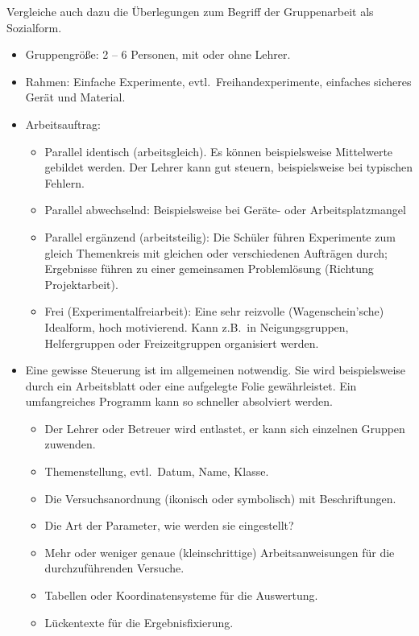 Vergleiche auch dazu die \"{U}berlegungen zum Begriff der
Gruppenarbeit als Sozialform.

\begin{itemize}
	\item
	Gruppengr\"{o}{\ss}e: 2 -- 6 Personen, mit oder ohne Lehrer.
	
	\item
	Rahmen: Einfache Experimente, evtl.\ Freihandexperimente,
	einfaches sicheres Ger\"{a}t und Material.
	\item
	Arbeitsauftrag:
	\begin{itemize}
		\item
		Parallel identisch (arbeitsgleich).
		Es k\"{o}nnen beispielsweise Mittelwerte gebildet werden.
		Der Lehrer kann gut steuern, beispielsweise bei typischen Fehlern.
		\item
		Parallel abwechselnd:
		Beispielsweise bei Ger\"{a}te- oder Arbeitsplatzmangel
		\item
		Parallel erg\"{a}nzend (arbeitsteilig):
		Die Sch\"{u}ler f\"{u}hren Experimente zum gleich Themenkreis mit
		gleichen oder verschiedenen Auftr\"{a}gen durch;
		Ergebnisse f\"{u}hren zu einer gemeinsamen Probleml\"{o}sung
		(Richtung Projektarbeit).
		\item
		Frei (Experimentalfreiarbeit):
		Eine sehr reizvolle (Wagenschein'sche) Idealform, hoch motivierend.
		Kann z.B.\ in Neigungsgruppen, Helfergruppen oder
		Freizeitgruppen organisiert werden.
	
	\end{itemize}
	
	\item
	Eine gewisse Steuerung ist im allgemeinen notwendig.
	Sie wird beispielsweise durch ein Arbeitsblatt oder eine
	aufgelegte Folie gew\"{a}hrleistet.
	Ein umfangreiches Programm kann so schneller absolviert werden.
	
	
	\begin{itemize}
		\item
		Der Lehrer oder Betreuer wird entlastet, er kann sich
		einzelnen Gruppen zuwenden.
		\item
		Themenstellung, evtl.\ Datum, Name, Klasse.
		\item
		Die Versuchsanordnung (ikonisch oder symbolisch)
		mit Beschriftungen.
		\item
		Die Art der Parameter, wie werden sie eingestellt?
		\item
		Mehr oder weniger genaue (kleinschrittige) Arbeitsanweisungen
		f\"{u}r die durchzuf\"{u}hrenden Versuche.
		\item
		Tabellen oder Koordinatensysteme f\"{u}r die Auswertung.
		\item
		L\"{u}ckentexte f\"{u}r die Ergebnisfixierung.
	

\end{itemize}
\end{itemize}
